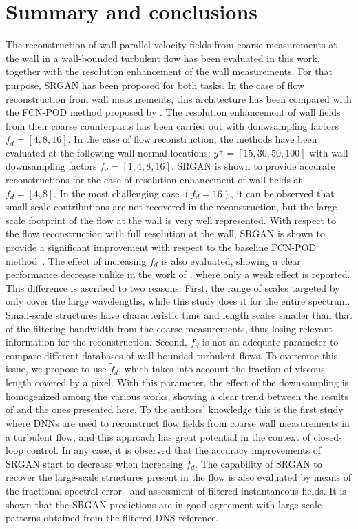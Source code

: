 \section{Summary and conclusions}\label{sec:concl}
The reconstruction of wall-parallel velocity fields from coarse measurements at the wall in a wall-bounded turbulent flow has been evaluated in this work, together with the resolution enhancement of the wall measurements.
For that purpose, SRGAN has been proposed for both tasks.
In the case of flow reconstruction from wall measurements, this architecture has been compared with the FCN-POD method proposed by \citet{guastoni2020convolutional}.
The resolution enhancement of wall fields from their coarse counterparts has been carried out with donwsampling factors $f_d=[4,8,16]$.
In the case of flow reconstruction, the methods have been evaluated at the following wall-normal locations: $y^+=[15,30,50,100]$ with wall downsampling factors $f_d=[1,4,8,16]$.
SRGAN is shown to provide accurate reconstructions for the case of resolution enhancement of wall fields at $f_d=[4,8]$.
In the most challenging case $(f_d=16)$, it can be observed that small-scale contributions are not recovered in the reconstruction, but the large-scale footprint of the flow at the wall is very well represented.
With respect to the flow reconstruction with full resolution at the wall, SRGAN is shown to provide a significant improvement with respect to the baseline FCN-POD method~\citep{guastoni2020convolutional}.
The effect of increasing $f_d$ is also evaluated, showing a clear performance decrease unlike in the work of \citet{guemes2019sensing}, where only a weak effect is reported.
This difference is ascribed to two reasons: First, the range of scales targeted by \citet{guemes2019sensing} only cover the large wavelengths, while this study does it for the entire spectrum.
Small-scale structures have characteristic time and length scales smaller than that of the filtering bandwidth from the coarse measurements, thus losing relevant information for the reconstruction.
Second, $f_d$ is not an adequate parameter to compare different databases of wall-bounded turbulent flows.
To overcome this issue, we propose to use $\tilde{f}_{d}$, which takes into account the fraction of viscous length covered by a pixel.
With this parameter, the effect of the downsampling is homogenized among the various works, showing a clear trend between the results of \citet{guemes2019sensing} and the ones presented here.
To the authors' knowledge this is the first study where DNNs are used to reconstruct flow fields from coarse wall measurements in a turbulent flow, and this approach has great potential in the context of closed-loop control.
In any case, it is observed that the accuracy improvements of SRGAN start to decrease when increasing $f_d$.
The capability of SRGAN to recover the large-scale structures present in the flow is also evaluated by means of the fractional spectral error~\citep{encinar2019logarithmic} and assessment of filtered instantaneous fields.
It is shown that the SRGAN predictions are in good agreement with large-scale patterns obtained from the filtered DNS reference.


